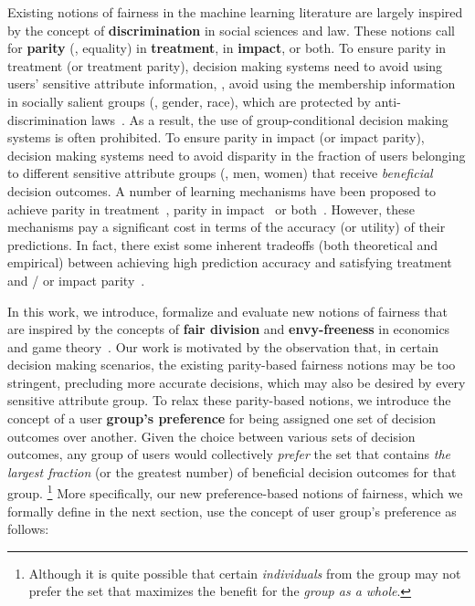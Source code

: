 \documentclass{article}
\begin{document}
Existing notions of fairness in the machine learning literature are largely inspired by the concept of {\bf discrimination} in social sciences
and law. These notions call for {\bf parity} (\ie, equality) in {\bf treatment}, in {\bf impact}, or both.
To ensure parity in treatment (or treatment parity), decision making systems need to avoid using users'{} sensitive attribute information, \ie, avoid using the
membership information in socially salient groups (\eg, gender, race), which are protected by anti-discrimination laws~\cite{barocas_2016, civil_rights_act}. As a result, the use of group-conditional
decision making systems is often prohibited.
To ensure parity in impact (or impact parity), decision making systems need to avoid disparity in the fraction of users belonging to different sensitive
attribute groups (\eg, men, women) that receive {\it beneficial} decision outcomes.
A number of learning mechanisms have been proposed to achieve parity in treatment~\cite{salvatore_knn}, parity
in impact~\cite{cadlers_naivebayes, hardt_nips16, kamishima_regularizer} or both~\cite{Dwork2012,feldman_kdd15,goh_nips2016,kamiran_sampling,zafar_dmt,zafar_fairness,icml2013_zemel13}.
However, these mechanisms pay a significant cost in terms of the accuracy (or utility) of their predictions. In fact, there exist
some inherent tradeoffs (both theoretical and empirical) between achieving high prediction accuracy and satisfying treatment and / or
impact parity~\cite{dimpact_fpr,goel_cost_fairness, friedler_impossibility, kleinberg_itcs17}.







In this work, we introduce, formalize and evaluate new notions of fairness that are inspired by the concepts of {\bf fair division} and {\bf envy-freeness} in economics
and game theory~\cite{berliant_envy,nash1950bargaining,varian_envy}.  Our work is motivated by the observation that, in certain decision making scenarios, the existing parity-based fairness notions may
be too stringent, precluding more accurate decisions, which may also be desired by every sensitive attribute group.
To relax these parity-based notions, we introduce the concept of a user {\bf group'{}s  preference} for being assigned one set of decision outcomes over another. Given
the choice between various sets of decision outcomes, any group of users would collectively {\it prefer} the set that contains {\it the largest fraction} (or the greatest number)
of beneficial decision outcomes for that group.
\footnote{\scriptsize{Although it is quite possible that certain \textit{individuals} from the group may not prefer the set that maximizes the benefit for the \textit{group as a whole}.}}
More specifically, our new preference-based notions of fairness, which we formally define in the next section, use the concept of user group'{}s preference as follows:
\end{document}
